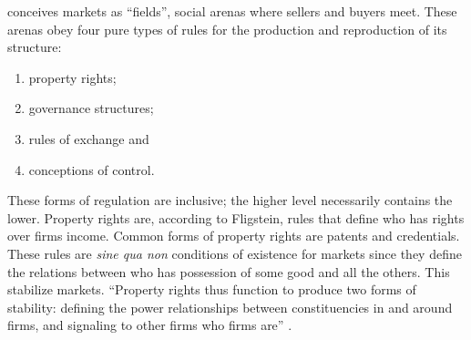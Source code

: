 \documentclass[a4paper, 12pt, openright, oneside, german, french, brazil, english]{abntex2}
\begin{document}
	
	 conceives markets as ``fields'', social arenas where sellers and buyers meet. These arenas obey four pure types of rules for the production and reproduction of its structure:
	
	\begin{enumerate}
		\item property rights;
		\item governance structures;
		\item rules of exchange and
		\item conceptions of control.
	\end{enumerate}
	
	
		
	
	These forms of regulation are inclusive; the higher level necessarily contains the lower. Property rights are, according to Fligstein, rules that define who has rights over firms income. Common forms of property rights are patents and credentials. These rules are \textit{sine qua non} conditions of existence for markets since they define the relations between who has possession of some good and all the others. This stabilize markets. ``Property rights thus function to produce two forms of stability: defining the power relationships between constituencies in and around firms, and signaling to other firms who firms are'' \cite[p. 34]{fligstein2002architecture}.
	
	
\end{document}
